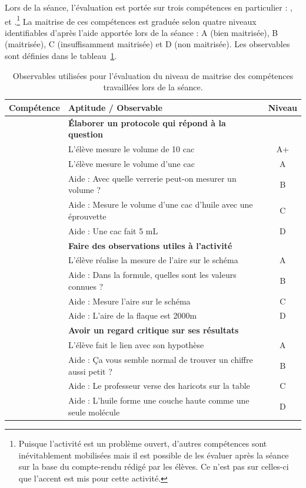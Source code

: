 \documentclass[12pt,a4paper]{article}
\begin{document}
Lors de la séance, l'évaluation est portée sur trois compétences en particulier : \anarai{}, \rea{} et \val{}.\footnote{Puisque l'activité est un problème ouvert, d'autres compétences sont inévitablement mobilisées mais il est possible de les évaluer après la séance sur la base du compte-rendu rédigé par les élèves.
Ce n'est pas sur celles-ci que l'accent est mis pour cette activité.}
La maitrise de ces compétences est graduée selon quatre niveaux identifiables d'après l'aide apportée lors de la séance : A (bien maitrisée), B (maitrisée), C (insuffisamment maitrisée) et D (non maitrisée).
Les observables sont définies dans le tableau~\ref{tab:obs}.

\begin{table}
\center
\begin{tabular}{l|l|c}
\textbf{Compétence} & \textbf{Aptitude} / Observable & \textbf{Niveau} \\
\hline \hline
\anarai 	& \textbf{Élaborer un protocole qui répond à la question} 	& \\
				& L'élève mesure le volume de 10 cac				 						& A+ \\
				& L'élève mesure le volume d'une cac 									& A \\
				& Aide : Avec quelle verrerie peut-on mesurer un volume ?	& B \\
				& Aide : Mesure le volume d'une cac d'huile avec une éprouvette & C \\
				& Aide : Une cac fait 5 mL 															& D \\
\hline
\rea			& \textbf{Faire des observations utiles à l'activité}					& \\
				& L'élève réalise la mesure de l'aire sur le schéma				& A \\
				& Aide : Dans la formule, quelles sont les valeurs connues ? & B \\
				& Aide : Mesure l'aire sur le schéma											& C \\
				& Aide : L'aire de la flaque est \unit{2000}{m\squared}			& D \\
\hline
\val			& \textbf{Avoir un regard critique sur ses résultats}				& \\
				& L'élève fait le lien avec son hypothèse									& A \\
				& Aide : Ça vous semble normal de trouver un chiffre aussi petit ? & B \\
				& Aide : Le professeur verse des haricots sur la table			& C \\
				& Aide : L'huile forme une couche haute comme une seule molécule & D \\
\end{tabular}
\caption{Observables utilisées pour l'évaluation du niveau de maitrise des compétences travaillées lors de la séance.}
\label{tab:obs}
\end{table}
\end{document}
